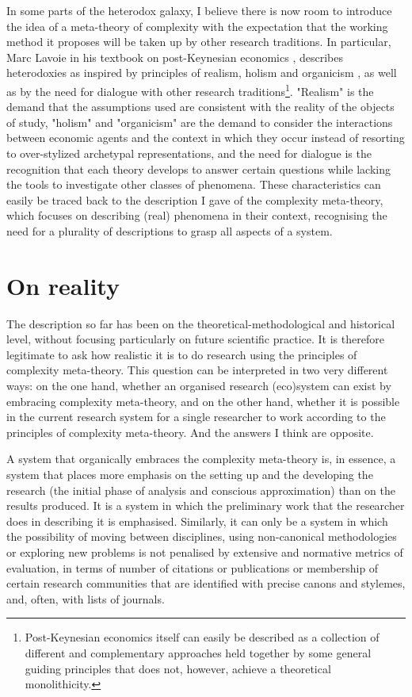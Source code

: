 In some parts of the heterodox galaxy, I believe there is now room to introduce the idea of a meta-theory of complexity with the expectation that the working method it proposes will be taken up by other research traditions.
In particular, Marc Lavoie in his textbook on post-Keynesian economics \parencite{lavoie2022}, describes heterodoxies as inspired by principles of realism, holism and organicism \parencite[][p. 12]{lavoie2022}, as well as by the need for dialogue with other research traditions\footnote{Post-Keynesian economics itself can easily be described as a collection of different and complementary approaches held together by some general guiding principles that does not, however, achieve a theoretical monolithicity.}. "Realism" is the demand that the assumptions used are consistent with the reality of the objects of study, "holism" and "organicism" are the demand to consider the interactions between economic agents and the context in which they occur instead of resorting to over-stylized archetypal representations, and the need for dialogue is the recognition that each theory develops to answer certain questions while lacking the tools to investigate other classes of phenomena.
These characteristics can easily be traced back to the description I gave of the complexity meta-theory, which focuses on describing (real) phenomena in their context, recognising the need for a plurality of descriptions to grasp all aspects of a system.

\section{On reality}
The description so far has been on the theoretical-methodological and historical level, without focusing particularly on future scientific practice.
It is therefore legitimate to ask how realistic it is to do research using the principles of complexity meta-theory.
This question can be interpreted in two very different ways: on the one hand, whether an organised research (eco)system can exist by embracing complexity meta-theory, and on the other hand, whether it is possible in the current research system for a single researcher to work according to the principles of complexity meta-theory. And the answers I think are opposite.

A system that organically embraces the complexity meta-theory is, in essence, a system that places more emphasis on the setting up and the developing the research (the initial phase of analysis and conscious approximation) than on the results produced. It is a system in which the preliminary work that the researcher does in describing it is emphasised.
Similarly, it can only be a system in which the possibility of moving between disciplines, using non-canonical methodologies or exploring new problems is not penalised by extensive and normative metrics of evaluation, in terms of number of citations or publications or membership of certain research communities that are identified with precise canons and stylemes, and, often, with lists of journals.

